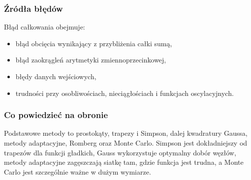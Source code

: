 \subsubsection{Źródła błędów}

Błąd całkowania obejmuje:
\begin{itemize}
  \item błąd obcięcia wynikający z przybliżenia całki sumą,
  \item błąd zaokrągleń arytmetyki zmiennoprzecinkowej,
  \item błędy danych wejściowych,
  \item trudności przy osobliwościach, nieciągłościach i funkcjach oscylacyjnych.
\end{itemize}

\subsubsection{Co powiedzieć na obronie}

Podstawowe metody to prostokąty, trapezy i Simpson, dalej kwadratury Gaussa, metody adaptacyjne, Romberg oraz Monte Carlo. Simpson jest dokładniejszy od trapezów dla funkcji gładkich, Gauss wykorzystuje optymalny dobór węzłów, metody adaptacyjne zagęszczają siatkę tam, gdzie funkcja jest trudna, a Monte Carlo jest szczególnie ważne w dużym wymiarze.
